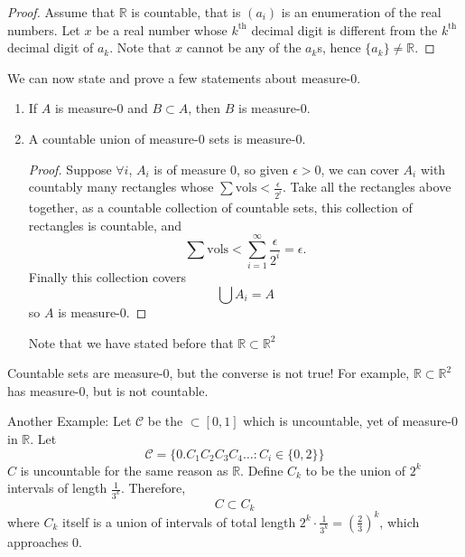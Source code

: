 \documentclass{article}
\numberwithin{equation}{section}
\begin{document}
\begin{proof}
    Assume that $\mathbb{R}$ is countable, that is $(a_i)$ is an enumeration of the real numbers. Let $x$ be a real number whose $k^\text{th}$ decimal digit is different from the $k^\text{th}$ decimal digit of $a_k$. Note that $x$ cannot be any of the $a_k$s, hence $\{a_k\}\neq \mathbb{R}$.
\end{proof}
We can now state and prove a few statements about measure-$0$.
\begin{enumerate}
    \item If $A$ is measure-$0$ and $B\subset A$, then $B$ is measure-$0$.
    \item A countable union of measure-$0$ sets is measure-$0$.
          \begin{proof}
              Suppose $\forall i$, $A_i$ is of measure $0$, so given $\epsilon > 0$, we can cover $A_i$ with countably many rectangles whose $\sum\text{vols} < \frac{\epsilon}{2^i}$. Take all the rectangles above together, as a countable collection of countable sets, this collection of rectangles is countable, and
              \begin{equation}
                  \sum\text{vols} < \sum_{i=1}^\infty \frac{\epsilon}{2^i} = \epsilon.
              \end{equation}
              Finally this collection covers
              \begin{equation}
                  \bigcup A_i = A
              \end{equation}
              so $A$ is measure-$0$.
          \end{proof}
          Note that we have stated before that $\mathbb{R} \subset \mathbb{R}^2$
\end{enumerate}
\begin{warning}
    Countable sets are measure-$0$, but the converse is not true! For example, $\mathbb{R}\subset\mathbb{R}^2$ has measure-$0$, but is not countable.
\end{warning}
Another Example: Let $\mathcal{C}$ be the  $\subset [0,1]$ which is uncountable, yet of measure-$0$ in $\mathbb{R}$. Let
\begin{equation}
    \mathcal{C} = \{0.C_1C_2C_3C_4\dots: C_i \in \{0,2\}\}
\end{equation}
$C$ is uncountable for the same reason as $\mathbb{R}$. Define $C_k$ to be the union of $2^k$ intervals of length $\frac{1}{3^k}$. Therefore,
\begin{equation}
    C \subset C_k
\end{equation}
where $C_k$ itself is a union of intervals of total length $2^k \cdot \frac{1}{3^k} = \left(\frac{2}{3}\right)^k$, which approaches $0$.
\end{document}
